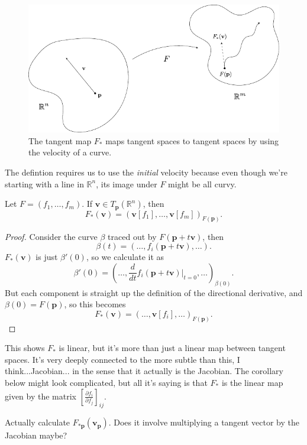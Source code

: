 \documentclass[10pt]{report}
\begin{document}
\begin{figure}[H]
	\centering
	\includegraphics[scale=1]{fig/tan-map.pdf}
	\caption{The tangent map $F_*$ maps tangent spaces to tangent spaces by using the velocity of a curve.}
\end{figure}

The defintion requires us to use the \textit{initial} velocity because even though we're starting with a line in $\mathbb{R}^n$, its image under $F$ might be all curvy.

\begin{prop}
	Let $F=(f_1, \dots, f_m)$. If $\mathbf{v} \in T_{\mathbf{p}}(\mathbb{R}^n)$, then
	\[
		F_{*}(\mathbf{v}) = (\mathbf{v}[f_1], \dots, \mathbf{v}[f_m])_{F(\mathbf{p})}.
	\] 
\end{prop}
\begin{proof}
	Consider the curve $\beta$ traced out by $F(\mathbf{p}+t\mathbf{v})$, then
	\[
		\beta(t) = (\dots, f_i(\mathbf{p}+t\mathbf{v}), \dots).
	\] $F_{*}(\mathbf{v})$ is just $\beta'(0)$, so we calculate it as
	\[
		\beta'(0) = \left( \dots, \frac{d }{d t} f_i(\mathbf{p}+t\mathbf{v}) \Big|_{t=0}, \dots \right)_{\beta(0)}.
	\] But each component is straight up the definition of the directional derivative, and $\beta(0) = F(\mathbf{p})$, so this becomes
	\[
		F_{*}(\mathbf{v}) = (\dots, \mathbf{v}[f_i], \dots)_{F(\mathbf{p})}.
	\] 
\end{proof}

This shows $F_*$ is linear, but it's more than just a linear map between tangent spaces. It's very deeply connected to the {\color{red}more subtle than this, I think...}Jacobian... in the sense that it actually is the Jacobian. The corollary below might look complicated, but all it's saying is that $F_*$ is the linear map given by the matrix $[\frac{\partial f_i}{\partial f_j} ]_{ij}.$

{\color{red}Actually calculate $F_{*\mathbf{p}}(\mathbf{v}_{\mathbf{p}})$. Does it involve multiplying a tangent vector by the Jacobian maybe?}
\end{document}
